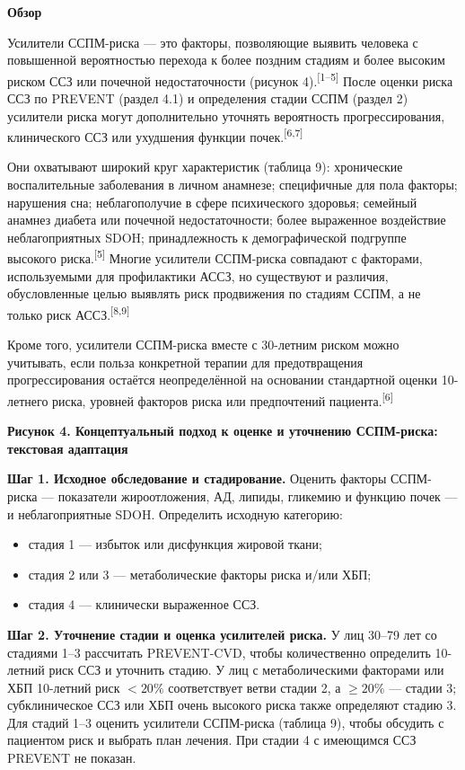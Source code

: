 \documentclass[11pt,a4paper]{article}
\newcommand{\src}[1]{\textsuperscript{[#1]}}
\newcommand{\heading}[1]{\par\medskip\textbf{#1}\par}
\begin{document}
\heading{Обзор}
Усилители ССПМ-риска --- это факторы, позволяющие выявить человека с повышенной вероятностью перехода к более поздним стадиям и более высоким риском ССЗ или почечной недостаточности (рисунок 4).\src{1--5} После оценки риска ССЗ по PREVENT (раздел 4.1) и определения стадии ССПМ (раздел 2) усилители риска могут дополнительно уточнять вероятность прогрессирования, клинического ССЗ или ухудшения функции почек.\src{6,7}

Они охватывают широкий круг характеристик (таблица 9): хронические воспалительные заболевания в личном анамнезе; специфичные для пола факторы; нарушения сна; неблагополучие в сфере психического здоровья; семейный анамнез диабета или почечной недостаточности; более выраженное воздействие неблагоприятных SDOH; принадлежность к демографической подгруппе высокого риска.\src{5} Многие усилители ССПМ-риска совпадают с факторами, используемыми для профилактики АССЗ, но существуют и различия, обусловленные целью выявлять риск продвижения по стадиям ССПМ, а не только риск АССЗ.\src{8,9}

Кроме того, усилители ССПМ-риска вместе с 30-летним риском можно учитывать, если польза конкретной терапии для предотвращения прогрессирования остаётся неопределённой на основании стандартной оценки 10-летнего риска, уровней факторов риска или предпочтений пациента.\src{6}

\heading{Рисунок 4. Концептуальный подход к оценке и уточнению ССПМ-риска: текстовая адаптация}
\textbf{Шаг 1. Исходное обследование и стадирование.} Оценить факторы ССПМ-риска --- показатели жироотложения, АД, липиды, гликемию и функцию почек --- и неблагоприятные SDOH. Определить исходную категорию:
\begin{itemize}
\item стадия 1 --- избыток или дисфункция жировой ткани;
\item стадия 2 или 3 --- метаболические факторы риска и/или ХБП;
\item стадия 4 --- клинически выраженное ССЗ.
\end{itemize}

\textbf{Шаг 2. Уточнение стадии и оценка усилителей риска.} У лиц 30--79 лет со стадиями 1--3 рассчитать PREVENT-CVD, чтобы количественно определить 10-летний риск ССЗ и уточнить стадию. У лиц с метаболическими факторами или ХБП 10-летний риск $<20\%$ соответствует ветви стадии 2, а $\geq20\%$ --- стадии 3; субклиническое ССЗ или ХБП очень высокого риска также определяют стадию 3. Для стадий 1--3 оценить усилители ССПМ-риска (таблица 9), чтобы обсудить с пациентом риск и выбрать план лечения. При стадии 4 с имеющимся ССЗ PREVENT не показан.
\end{document}
